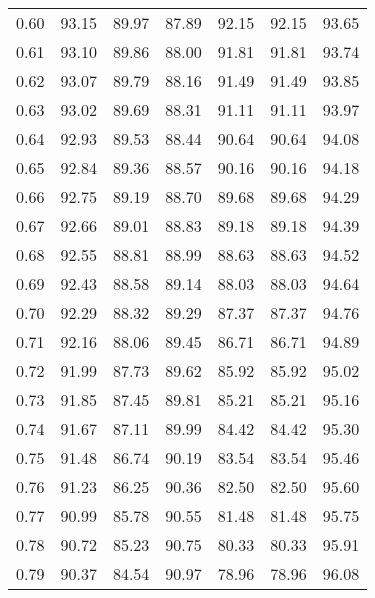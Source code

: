 \begin{tabular}{|c|c|c|c|c|c|c|}
      0.60 &     93.15 &     89.97 &      87.89 &   92.15 &      92.15 &         93.65 \\
      0.61 &     93.10 &     89.86 &      88.00 &   91.81 &      91.81 &         93.74 \\
      0.62 &     93.07 &     89.79 &      88.16 &   91.49 &      91.49 &         93.85 \\
      0.63 &     93.02 &     89.69 &      88.31 &   91.11 &      91.11 &         93.97 \\
      0.64 &     92.93 &     89.53 &      88.44 &   90.64 &      90.64 &         94.08 \\
      0.65 &     92.84 &     89.36 &      88.57 &   90.16 &      90.16 &         94.18 \\
      0.66 &     92.75 &     89.19 &      88.70 &   89.68 &      89.68 &         94.29 \\
      0.67 &     92.66 &     89.01 &      88.83 &   89.18 &      89.18 &         94.39 \\
      0.68 &     92.55 &     88.81 &      88.99 &   88.63 &      88.63 &         94.52 \\
      0.69 &     92.43 &     88.58 &      89.14 &   88.03 &      88.03 &         94.64 \\
      0.70 &     92.29 &     88.32 &      89.29 &   87.37 &      87.37 &         94.76 \\
      0.71 &     92.16 &     88.06 &      89.45 &   86.71 &      86.71 &         94.89 \\
      0.72 &     91.99 &     87.73 &      89.62 &   85.92 &      85.92 &         95.02 \\
      0.73 &     91.85 &     87.45 &      89.81 &   85.21 &      85.21 &         95.16 \\
      0.74 &     91.67 &     87.11 &      89.99 &   84.42 &      84.42 &         95.30 \\
      0.75 &     91.48 &     86.74 &      90.19 &   83.54 &      83.54 &         95.46 \\
      0.76 &     91.23 &     86.25 &      90.36 &   82.50 &      82.50 &         95.60 \\
      0.77 &     90.99 &     85.78 &      90.55 &   81.48 &      81.48 &         95.75 \\
      0.78 &     90.72 &     85.23 &      90.75 &   80.33 &      80.33 &         95.91 \\
      0.79 &     90.37 &     84.54 &      90.97 &   78.96 &      78.96 &         96.08 \\

\end{tabular}
